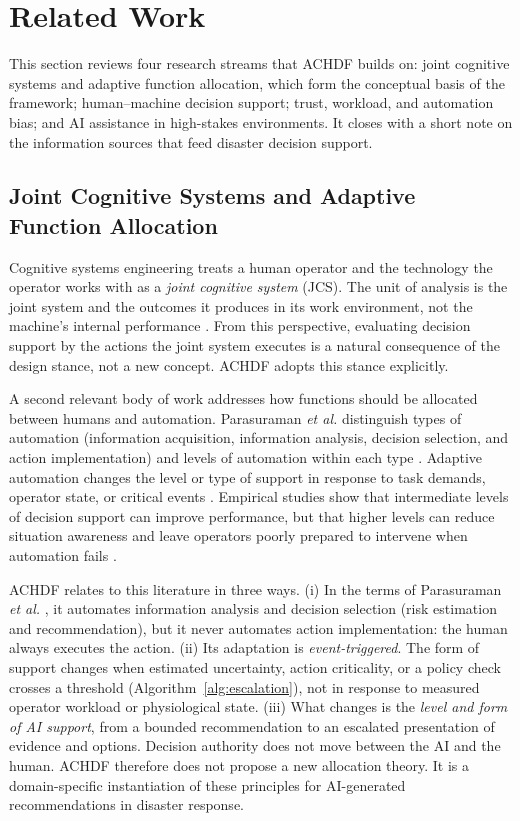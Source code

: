 \documentclass[journal]{IEEEtran}
\theoremstyle{plain}
\theoremstyle{definition}
\begin{document}
\section{Related Work}
This section reviews four research streams that ACHDF builds on: joint cognitive systems and adaptive function allocation, which form the conceptual basis of the framework; human--machine decision support; trust, workload, and automation bias; and AI assistance in high-stakes environments. It closes with a short note on the information sources that feed disaster decision support.

\subsection{Joint Cognitive Systems and Adaptive Function Allocation}
Cognitive systems engineering treats a human operator and the technology the operator works with as a \emph{joint cognitive system} (JCS). The unit of analysis is the joint system and the outcomes it produces in its work environment, not the machine's internal performance \cite{Hollnagel2005JCS,Woods2006JCS}. From this perspective, evaluating decision support by the actions the joint system executes is a natural consequence of the design stance, not a new concept. ACHDF adopts this stance explicitly.

A second relevant body of work addresses how functions should be allocated between humans and automation. Parasuraman \emph{et al.} distinguish types of automation (information acquisition, information analysis, decision selection, and action implementation) and levels of automation within each type \cite{Parasuraman2000LOA}. Adaptive automation changes the level or type of support in response to task demands, operator state, or critical events \cite{Scerbo2007,Kaber2004}. Empirical studies show that intermediate levels of decision support can improve performance, but that higher levels can reduce situation awareness and leave operators poorly prepared to intervene when automation fails \cite{Kaber2004,Parasuraman2010}.

ACHDF relates to this literature in three ways. (i) In the terms of Parasuraman \emph{et al.} \cite{Parasuraman2000LOA}, it automates information analysis and decision selection (risk estimation and recommendation), but it never automates action implementation: the human always executes the action. (ii) Its adaptation is \emph{event-triggered}. The form of support changes when estimated uncertainty, action criticality, or a policy check crosses a threshold (Algorithm~\ref{alg:escalation}), not in response to measured operator workload or physiological state. (iii) What changes is the \emph{level and form of AI support}, from a bounded recommendation to an escalated presentation of evidence and options. Decision authority does not move between the AI and the human. ACHDF therefore does not propose a new allocation theory. It is a domain-specific instantiation of these principles for AI-generated recommendations in disaster response.
\end{document}
